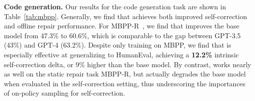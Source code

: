 \begin{table}[t]
\centering
\renewcommand{\arraystretch}{1.1}
\caption{\footnotesize{\textbf{Performance of \methodname{} on HumanEval.} \methodname{} attains the highest self-correction performance (\textbf{Accuracy@t2}, \textbf{$\Delta$(t1, t2)}), and also outperforms other methods at offline correction (\textbf{MBPP-R}).}}
\vspace{-0.1cm}
\vspace{-0.1cm}
\label{tab:mbpp}
\end{table}

\textbf{Code generation.} Our results for the code generation task are shown in Table~\ref{tab:mbpp}. Generally, we find that \methodname{} achieves both improved self-correction and offline repair performance. For MBPP-R~\citep{ni2024next}, we find that \methodname{} improves the base model from 47.3\% to 60.6\%, which is comparable to the gap between GPT-3.5 (43\%) and GPT-4 (63.2\%). Despite only training on MBPP, we find that \methodname{} is especially effective at generalizing to HumanEval, achieving a \textbf{12.2\%} intrinsic self-correction delta, or 9\% higher than the base model. By contrast, \pairsft{} works nearly as well on the static repair task MBPP-R, but actually degrades the base model when evaluated in the self-correction setting, thus underscoring the importances of on-policy sampling for self-correction.

